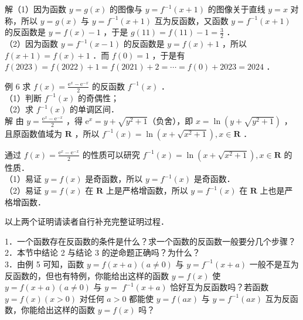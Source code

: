 \documentclass[10pt]{article}
\begin{document}
解（1）因为函数 \(y=g(x)\) 的图像与 \(y=f^{-1}(x+1)\) 的图像关于直线 \(y=x\) 对称，所以 \(y=g(x)\) 与 \(y=f^{-1}(x+1)\) 互为反函数，又函数 \(y=f^{-1}(x+1)\) 的反函数是 \(y=f(x)-1\) ，于是 \(g(11)=f(11)-1=\frac{3}{2}\) ．\\
（2）因为函数 \(y=f^{-1}(x-1)\) 的反函数是 \(y=f(x)+1\) ，所以 \(f(x+1)=f(x)+1\) ．而 \(f(0)=1\) ，于是有 \(f(2023)=f(2022)+1=f(2021)+2=\cdots=f(0)+2023=2024\) ．

例 6 求 \(f(x)=\frac{\mathrm{e}^{x}-\mathrm{e}^{-x}}{2}\) 的反函数 \(f^{-1}(x)\) ．\\
（1）判断 \(f^{-1}(x)\) 的奇偶性；\\
（2）求 \(f^{-1}(x)\) 的单调区间．\\
解 由 \(y=\frac{\mathrm{e}^{x}-\mathrm{e}^{-x}}{2}\) ，得 \(\mathrm{e}^{x}=y+\sqrt{y^{2}+1}\)（负舍），即 \(x=\ln \left(y+\sqrt{y^{2}+1}\right)\) ，且原函数值域为 \(\mathbf{R}\) ，所以 \(f^{-1}(x)=\ln \left(x+\sqrt{x^{2}+1}\right), x \in \mathbf{R}\) ．

通过 \(f(x)=\frac{\mathrm{e}^{x}-\mathrm{e}^{-x}}{2}\) 的性质可以研究 \(f^{-1}(x)=\ln \left(x+\sqrt{x^{2}+1}\right), x \in \mathbf{R}\) 的性质．\\
（1）易证 \(y=f(x)\) 是奇函数，所以 \(y=f^{-1}(x)\) 是奇函数．\\
（2）易证 \(y=f(x)\) 在 \(\mathbf{R}\) 上是严格增函数，所以 \(y=f^{-1}(x)\) 在 \(\mathbf{R}\) 上也是严格增函数．

以上两个证明请读者自行补充完整证明过程．

1．一个函数存在反函数的条件是什么？求一个函数的反函数一般要分几个步骤？\\
2．本节中结论 2 与结论 3 的逆命题正确吗？为什么？\\
3．由例 5 可知，函数 \(y=f(x+a)(a \neq 0)\) 与 \(y=f^{-1}(x+a)\) 一般不是互为反函数的，但也有特例，你能给出这样的函数 \(y=f(x)\) 使 \(y=f(x+a)(a \neq 0)\) 与 \(y=\) \(f^{-1}(x+a)\) 恰好互为反函数吗？若函数 \(y=f(x)(x>0)\) 对任何 \(a>0\) 都能使 \(y=f(a x)\) 与 \(y=f^{-1}(a x)\) 互为反函数，你能给出这样的函数 \(y=f(x)\) 吗？
\end{document}
